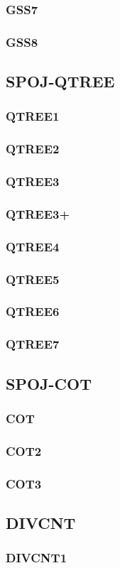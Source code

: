 \documentclass{article}
\begin{document}
\subsubsection{GSS7} 

\subsubsection{GSS8} 

\subsection{SPOJ-QTREE} 
\subsubsection{QTREE1} 

\subsubsection{QTREE2} 

\subsubsection{QTREE3} 

\subsubsection{QTREE3+} 

\subsubsection{QTREE4} 

\subsubsection{QTREE5} 

\subsubsection{QTREE6} 

\subsubsection{QTREE7} 

\subsection{SPOJ-COT} 
\subsubsection{COT} 

\subsubsection{COT2} 

\subsubsection{COT3} 

\subsection{DIVCNT}
\subsubsection{DIVCNT1} 

\end{document}
